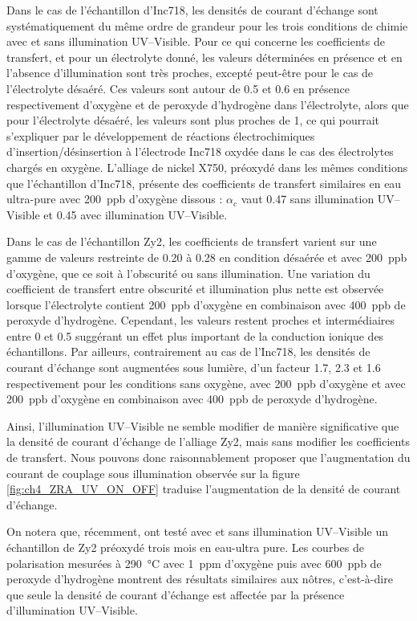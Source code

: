 \begin{refsection}
    Dans le cas de l’échantillon d’Inc718, les densités de courant d’échange sont systématiquement du même ordre de grandeur
    pour les trois conditions de chimie avec et sans illumination UV--Visible. Pour ce qui concerne les coefficients de
    transfert, et pour un électrolyte donné, les valeurs déterminées en présence et en l’absence d’illumination sont très
    proches, excepté peut-être pour le cas de l’électrolyte désaéré. Ces valeurs sont autour de 0.5 et 0.6 en présence
    respectivement d’oxygène et de peroxyde d’hydrogène dans l’électrolyte, alors que pour l’électrolyte désaéré, les
    valeurs sont plus proches de 1, ce qui pourrait s’expliquer par le développement de réactions électrochimiques
    d’insertion/désinsertion à l’électrode Inc718 oxydée dans le cas des électrolytes chargés en oxygène. L’alliage de
    nickel X750, préoxydé dans les mêmes conditions que l’échantillon d’Inc718, présente des coefficients de transfert
    similaires en eau ultra-pure avec 200~ppb d’oxygène dissous : $\alpha _c$ vaut 0.47 sans illumination UV--Visible et 0.45 avec
    illumination UV--Visible.

    Dans le cas de l’échantillon Zy2, les coefficients de transfert varient sur une gamme de valeurs restreinte de 0.20 à
    0.28 en condition désaérée et avec 200~ppb d’oxygène, que ce soit à l’obscurité ou sans illumination. Une variation du
    coefficient de transfert entre obscurité et illumination plus nette est observée lorsque l’électrolyte contient 200~ppb
    d’oxygène en combinaison avec 400~ppb de peroxyde d’hydrogène. Cependant, les valeurs restent proches et intermédiaires
    entre 0 et 0.5 suggérant un effet plus important de la conduction ionique des échantillons. Par ailleurs, contrairement
    au cas de l’Inc718, les densités de courant d’échange sont augmentées sous lumière, d’un facteur 1.7, 2.3 et 1.6
    respectivement pour les conditions sans oxygène, avec 200~ppb d’oxygène et avec 200~ppb d’oxygène en combinaison avec
    400~ppb de peroxyde d’hydrogène.


    Ainsi, l’illumination UV--Visible ne semble modifier de manière significative que la densité de courant d’échange de
    l’alliage Zy2, mais sans modifier les coefficients de transfert. Nous pouvons donc raisonnablement proposer que
    l’augmentation du courant de couplage sous illumination observée sur la figure \ref{fig:ch4_ZRA_UV_ON_OFF} traduise
    l’augmentation de la densité
    de courant d’échange.

    On notera que, récemment, \citet{Kim2014} ont testé avec et sans illumination UV--Visible un échantillon de Zy2 préoxydé
    trois mois en eau-ultra pure. Les courbes de polarisation mesurées à \SI{290}{\degreeCelsius} avec 1~ppm d’oxygène puis avec 600~ppb de
    peroxyde d’hydrogène montrent des résultats similaires aux nôtres, c’est-à-dire que seule la densité de courant
    d’échange est affectée par la présence d’illumination UV--Visible.


\end{refsection}
